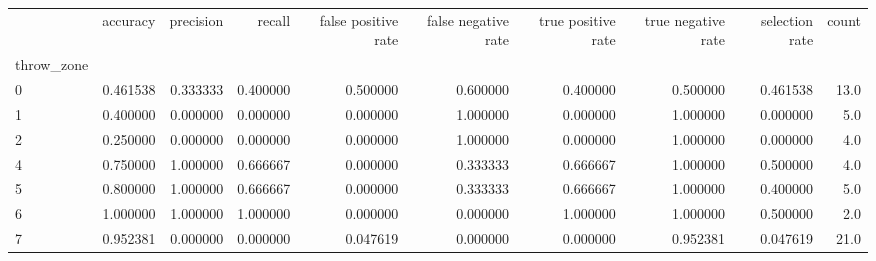 \begin{tabular}{lrrrrrrrrr}
\toprule
{} &  accuracy &  precision &    recall &  false positive rate &  false negative rate &  true positive rate &  true negative rate &  selection rate &  count \\
throw\_zone &           &            &           &                      &                      &                     &                     &                 &        \\
\midrule
0          &  0.461538 &   0.333333 &  0.400000 &             0.500000 &             0.600000 &            0.400000 &            0.500000 &        0.461538 &   13.0 \\
1          &  0.400000 &   0.000000 &  0.000000 &             0.000000 &             1.000000 &            0.000000 &            1.000000 &        0.000000 &    5.0 \\
2          &  0.250000 &   0.000000 &  0.000000 &             0.000000 &             1.000000 &            0.000000 &            1.000000 &        0.000000 &    4.0 \\
4          &  0.750000 &   1.000000 &  0.666667 &             0.000000 &             0.333333 &            0.666667 &            1.000000 &        0.500000 &    4.0 \\
5          &  0.800000 &   1.000000 &  0.666667 &             0.000000 &             0.333333 &            0.666667 &            1.000000 &        0.400000 &    5.0 \\
6          &  1.000000 &   1.000000 &  1.000000 &             0.000000 &             0.000000 &            1.000000 &            1.000000 &        0.500000 &    2.0 \\
7          &  0.952381 &   0.000000 &  0.000000 &             0.047619 &             0.000000 &            0.000000 &            0.952381 &        0.047619 &   21.0 \\
\bottomrule
\end{tabular}
